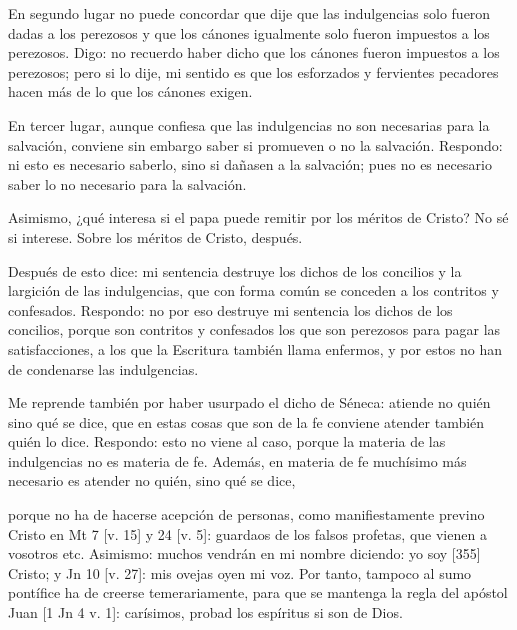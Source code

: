 En segundo lugar no puede concordar que dije que las indulgencias solo fueron dadas a los perezosos y que los cánones igualmente solo fueron impuestos a los perezosos. Digo: no recuerdo haber dicho que los cánones fueron impuestos a los perezosos; pero si lo dije, mi sentido es que los esforzados y fervientes pecadores hacen más de lo que los cánones exigen.

En tercer lugar, aunque confiesa que las indulgencias no son necesarias para la salvación, conviene sin embargo saber si promueven o no la salvación. Respondo: ni esto es necesario saberlo, sino si dañasen a la salvación; pues no es necesario saber lo no necesario para la salvación.

Asimismo, ¿qué interesa si el papa puede remitir por los méritos de Cristo? No sé si interese. Sobre los méritos de Cristo, después.

Después de esto dice: mi sentencia destruye los dichos de los concilios y la largición de las indulgencias, que con forma común se conceden a los contritos y confesados. Respondo: no por eso destruye mi sentencia los dichos de los concilios, porque son contritos y confesados los que son perezosos para pagar las satisfacciones, a los que la Escritura también llama enfermos, y por estos no han de condenarse las indulgencias.

Me reprende también por haber usurpado el dicho de Séneca: atiende no quién sino qué se dice, que en estas cosas que son de la fe conviene atender también quién lo dice. Respondo: esto no viene al caso, porque la materia de las indulgencias no es materia de fe. Además, en materia de fe muchísimo más necesario es atender no quién, sino qué se dice,

porque no ha de hacerse acepción de personas, como manifiestamente previno Cristo en Mt 7 [v. 15] y 24 [v. 5]: guardaos de los falsos profetas, que vienen a vosotros etc. Asimismo: muchos vendrán en mi nombre diciendo: yo soy [355] Cristo; y Jn 10 [v. 27]: mis ovejas oyen mi voz. Por tanto, tampoco al sumo pontífice ha de creerse temerariamente, para que se mantenga la regla del apóstol Juan [1 Jn 4 v. 1]: carísimos, probad los espíritus si son de Dios.

